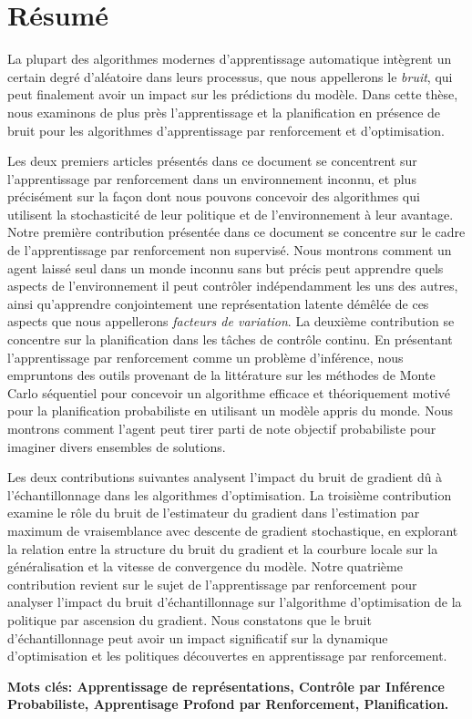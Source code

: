 \chapter*{R\'{e}sum\'{e}}
La plupart des algorithmes modernes d'apprentissage automatique intègrent un
certain degré d'aléatoire dans leurs processus, que nous appellerons le
\emph{bruit}, qui peut finalement avoir un impact sur les prédictions du modèle. Dans cette thèse, nous examinons de plus près l'apprentissage et la planification en présence de bruit pour les algorithmes d'apprentissage par renforcement et d'optimisation.

Les deux premiers articles présentés dans ce document se concentrent sur l'apprentissage par renforcement dans un environnement inconnu, et plus précisément sur la façon dont nous pouvons concevoir des algorithmes qui utilisent la stochasticité de leur politique et de l'environnement à leur avantage.
Notre première contribution présentée dans ce document se concentre sur le cadre
de l'apprentissage par renforcement non supervisé. Nous montrons comment un
agent laissé seul dans un monde inconnu sans but précis peut apprendre quels
aspects de l'environnement il peut contrôler indépendamment les uns des autres,
ainsi qu'apprendre conjointement une représentation latente démêlée de ces
aspects que nous appellerons \emph{facteurs de variation}.
La deuxième contribution se concentre sur la planification dans les tâches de
contrôle continu. En présentant l'apprentissage par renforcement comme un
problème d'inférence, nous empruntons des outils provenant de la littérature sur
les m\'{e}thodes de Monte Carlo séquentiel pour concevoir un algorithme efficace
et théoriquement motiv\'{e} pour la planification probabiliste en utilisant un
modèle appris du monde. Nous montrons comment l'agent peut tirer parti de note
objectif probabiliste pour imaginer divers ensembles de solutions.

Les deux contributions suivantes analysent l'impact du bruit de gradient dû à l'échantillonnage dans les algorithmes d'optimisation. 
La troisième contribution examine le rôle du bruit de l'estimateur du gradient dans l'estimation par maximum de vraisemblance avec descente de gradient stochastique, en explorant la relation entre la structure du bruit du gradient et la courbure locale sur la généralisation et la vitesse de convergence du modèle. 
Notre quatrième contribution revient sur le sujet de l'apprentissage par
renforcement pour analyser l'impact du bruit d'échantillonnage sur l'algorithme
d'optimisation de la politique par ascension du gradient. Nous constatons que le
bruit d'échantillonnage peut avoir un impact significatif sur la dynamique
d'optimisation et les politiques découvertes en apprentissage par
renforcement.


  {\bfseries Mots cl\'{e}s\hspace{-3pt}: Apprentissage de repr\'{e}sentations, Contr\^{o}le par Inf\'{e}rence Probabiliste, Apprentisage Profond par Renforcement, Planification.}
                                                                                                                                                            
